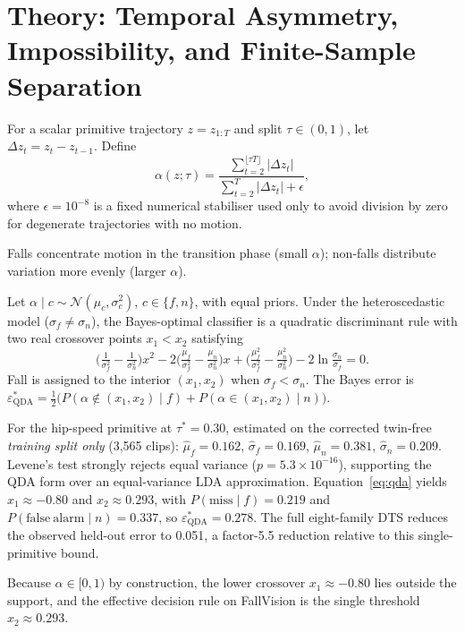 \section{Theory: Temporal Asymmetry, Impossibility, and Finite-Sample Separation}
\begin{definition}\label{def:alpha}
For a scalar primitive trajectory $z=z_{1:T}$ and split $\tau\in(0,1)$, let $\Delta z_t = z_t - z_{t-1}$. Define
\begin{equation}
\alpha(z;\tau)=\frac{\sum_{t=2}^{\lfloor \tau T\rfloor}|\Delta z_t|}{\sum_{t=2}^{T}|\Delta z_t| + \epsilon},
\label{eq:alpha}
\end{equation}
where $\epsilon=10^{-8}$ is a fixed numerical stabiliser used only to avoid division by zero for degenerate trajectories with no motion.
\end{definition}
Falls concentrate motion in the transition phase (small $\alpha$); non-falls distribute variation more evenly (larger $\alpha$).

\begin{theorem}\label{thm:qda}
Let $\alpha \mid c \sim \mathcal{N}(\mu_c,\sigma_c^2)$, $c\in\{f,n\}$, with equal priors. Under the heteroscedastic model ($\sigma_f\neq\sigma_n$), the Bayes-optimal classifier is a quadratic discriminant rule with two real crossover points $x_1<x_2$ satisfying
\begin{equation}
\Big(\tfrac{1}{\sigma_f^2}-\tfrac{1}{\sigma_n^2}\Big)x^2
-2\Big(\tfrac{\mu_f}{\sigma_f^2}-\tfrac{\mu_n}{\sigma_n^2}\Big)x
+\Big(\tfrac{\mu_f^2}{\sigma_f^2}-\tfrac{\mu_n^2}{\sigma_n^2}\Big)-2\ln\tfrac{\sigma_n}{\sigma_f}=0.
\label{eq:qda}
\end{equation}
Fall is assigned to the interior $(x_1,x_2)$ when $\sigma_f<\sigma_n$. The Bayes error is
$\varepsilon^{*}_{\mathrm{QDA}}=\tfrac12\big(P(\alpha\notin(x_1,x_2)\mid f)+P(\alpha\in(x_1,x_2)\mid n)\big)$.
\end{theorem}

\begin{proposition}\label{prop:empirical}
For the hip-speed primitive at $\tau^{*}=0.30$, estimated on the corrected twin-free \emph{training split only} (3,565 clips): $\hat\mu_f=0.162$, $\hat\sigma_f=0.169$, $\hat\mu_n=0.381$, $\hat\sigma_n=0.209$. Levene's test strongly rejects equal variance ($p=5.3{\times}10^{-16}$), supporting the QDA form over an equal-variance LDA approximation. Equation~\eqref{eq:qda} yields $x_1\approx-0.80$ and $x_2\approx 0.293$, with $P(\mathrm{miss}\mid f)=0.219$ and $P(\mathrm{false\ alarm}\mid n)=0.337$, so $\varepsilon^{*}_{\mathrm{QDA}}=0.278$. The full eight-family DTS reduces the observed held-out error to 0.051, a factor-5.5 reduction relative to this single-primitive bound.
\end{proposition}
Because $\alpha\in[0,1)$ by construction, the lower crossover $x_1\approx-0.80$ lies outside the support, and the effective decision rule on FallVision is the single threshold $x_2\approx0.293$.

